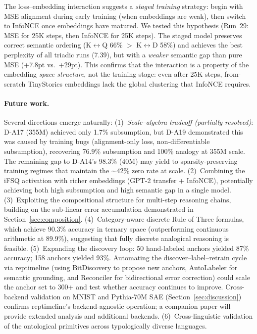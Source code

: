 \documentclass[11pt,a4paper]{article}
\begin{document}
The loss--embedding interaction suggests a \emph{staged training} strategy: begin with MSE alignment during early training (when embeddings are weak), then switch to InfoNCE once embeddings have matured. We tested this hypothesis (Run~29: MSE for 25K steps, then InfoNCE for 25K steps). The staged model preserves correct semantic ordering (K$\leftrightarrow$Q 66\% $>$ K$\leftrightarrow$D 58\%) and achieves the best perplexity of all triadic runs (7.39), but with a \emph{weaker} semantic gap than pure MSE (+7.8pt vs.\ +29pt). This confirms that the interaction is a property of the embedding \emph{space structure}, not the training stage: even after 25K steps, from-scratch TinyStories embeddings lack the global clustering that InfoNCE requires.

\paragraph{Future work.}
Several directions emerge naturally:
(1)~\emph{Scale--algebra tradeoff (partially resolved)}: D-A17 (355M) achieved only 1.7\% subsumption, but D-A19 demonstrated this was caused by training bugs (alignment-only loss, non-differentiable subsumption), recovering 76.9\% subsumption and 100\% analogy at 355M scale. The remaining gap to D-A14's 98.3\% (40M) may yield to sparsity-preserving training regimes that maintain the $\sim$42\% zero rate at scale.
(2)~Combining the iFSQ activation with richer embeddings (GPT-2 transfer + InfoNCE), potentially achieving both high subsumption and high semantic gap in a single model.
(3)~Exploiting the compositional structure for multi-step reasoning chains, building on the sub-linear error accumulation demonstrated in Section~\ref{sec:composition}.
(4)~Category-aware discrete Rule of Three formulas, which achieve 90.3\% accuracy in ternary space (outperforming continuous arithmetic at 89.9\%), suggesting that fully discrete analogical reasoning is feasible.
(5)~Expanding the discovery loop: 50 hand-labeled anchors yielded 87\% accuracy; 158 anchors yielded 93\%. Automating the discover--label--retrain cycle via reptimeline (using BitDiscovery to propose new anchors, AutoLabeler for semantic grounding, and Reconciler for bidirectional error correction) could scale the anchor set to 300+ and test whether accuracy continues to improve. Cross-backend validation on MNIST and Pythia-70M SAE (Section~\ref{sec:discussion}) confirms reptimeline's backend-agnostic operation; a companion paper will provide extended analysis and additional backends.
(6)~Cross-linguistic validation of the ontological primitives across typologically diverse languages.
\end{document}
